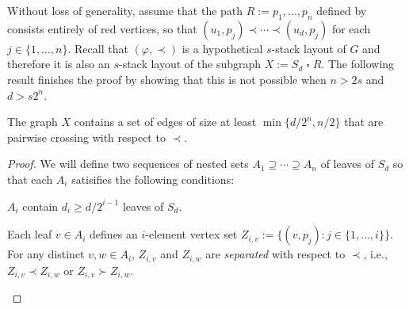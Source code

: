 \documentclass[kpfonts]{patmorin}
\renewcommand{\ge}{\geqslant}
\newcommand{\CartProd}{\mathbin{\square}}
\begin{document}
Without loss of generality, assume that the path $R:=p_1,\ldots,p_n$ defined by  consists entirely of red vertices, so that $(u_1,p_j)\prec\cdots\prec (u_d,p_j)$ for each $j\in\{1,\ldots,n\}$.
Recall that $(\varphi,\prec)$ is a hypothetical $s$-stack layout of $G$ and therefore it is also an $s$-stack layout of the subgraph $X:=S_d\CartProd R$.  The following result finishes the proof by showing that this is not possible when $n> 2s$ and $d> s2^{n}$.

\begin{lem}
    The graph $X$ contains a set of edges of size at least $\min\{d/2^{n},n/2\}$ that are pairwise crossing with respect to $\prec$.
\end{lem}

\begin{proof}
    We will define two sequences of nested sets $A_1\supseteq \cdots\supseteq A_{n}$ of leaves of $S_d$ so that each $A_i$ satisifies the following conditions:
    \begin{compactenum}[(C1)]
        \item $A_i$ contain $d_i\ge d/2^{i-1}$ leaves of $S_d$.
        \item Each leaf $v\in A_i$ defines an $i$-element vertex set $Z_{i,v}:=\{(v,p_j):j\in\{1,\ldots,i\}\}$.  For any distinct $v,w\in A_i$, $Z_{i,v}$ and $Z_{i,w}$ are \emph{separated} with respect to $\prec$, i.e., $Z_{i,v}\prec Z_{i,w}$ or $Z_{i,v}\succ Z_{i,w}$.
    \end{compactenum}


\end{proof}
\end{document}
